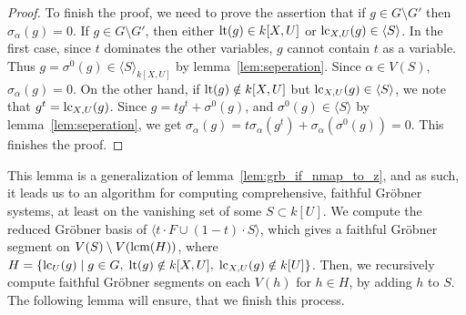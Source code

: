 \begin{proof}

  To finish the proof, we need to prove the assertion that if $g \in G \setminus G'$ then $\sigma_{\alpha}(g) = 0$. If $g \in G \setminus G'$, then either $\operatorname{lt}(g) \in k[X, U]$ or $\operatorname{lc}_{X, U}(g) \in \langle S \rangle $. In the first case, since $t$ dominates the other variables, $g$ cannot contain $t$ as a variable. Thus $g = \sigma^{0}(g) \in \langle S \rangle_{k[X, U]}$ by lemma~\ref{lem:seperation}. Since $\alpha \in V(S)$, $\sigma_{\alpha}(g) = 0$. On the other hand, if $\operatorname{lt}(g) \notin k[X, U]$ but $\operatorname{lc}_{X, U}(g) \in \langle S \rangle$, we note that $g^{t} = \operatorname{lc}_{X, U}(g)$. Since $g = tg^{t} + \sigma^{0}(g)$, and $\sigma^{0}(g) \in \langle S \rangle$ by lemma~\ref{lem:seperation}, we get $\sigma_{\alpha}(g) = t\sigma_{\alpha}(g^{t}) + \sigma_{\alpha}(\sigma^{0}(g)) = 0$. This finishes the proof.
\end{proof}

This lemma is a generalization of lemma~\ref{lem:grb_if_nmap_to_z}, and as such, it leads us to an algorithm for computing comprehensive, faithful Gröbner systems, at least on the vanishing set of some $S \subset k[U]$. We compute the reduced Gröbner basis of $\langle t\cdot F \cup (1-t)\cdot S \rangle$, which gives a faithful Gröbner segment on $V(S) \setminus V(\operatorname{lcm}(H))$, where $H = \{\operatorname{lc}_{U}(g) \mid g \in G,\; \operatorname{lt}(g) \notin k[X, U],\; \operatorname{lc}_{X, U}(g) \notin k[U]\}$. Then, we recursively compute faithful Gröbner segments on each $V(h)$ for $h \in H$, by adding $h$ to $S$. The following lemma will ensure, that we finish this process.


